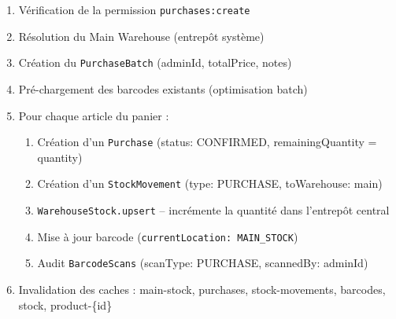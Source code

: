 \documentclass[12pt,a4paper,openany]{report}
\newcommand{\code}[1]{\texttt{#1}}
\begin{document}
\begin{enumerate}
  \item Vérification de la permission \code{purchases:create}
  \item Résolution du Main Warehouse (entrepôt système)
  \item Création du \code{PurchaseBatch} (adminId, totalPrice, notes)
  \item Pré-chargement des barcodes existants (optimisation batch)
  \item Pour chaque article du panier :
    \begin{enumerate}[label=\alph*.]
      \item Création d'un \code{Purchase} (status: CONFIRMED, remainingQuantity = quantity)
      \item Création d'un \code{StockMovement} (type: PURCHASE, toWarehouse: main)
      \item \code{WarehouseStock.upsert} -- incrémente la quantité dans l'entrepôt central
      \item Mise à jour barcode (\code{currentLocation: MAIN\_STOCK})
      \item Audit \code{BarcodeScans} (scanType: PURCHASE, scannedBy: adminId)
    \end{enumerate}
  \item Invalidation des caches : main-stock, purchases, stock-movements, barcodes, stock, product-\{id\}
\end{enumerate}
\end{document}

